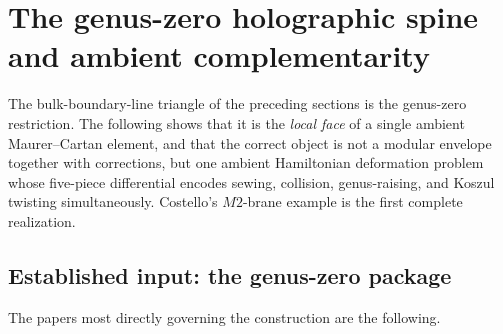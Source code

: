 


\section{The genus-zero holographic spine and ambient complementarity}

The bulk-boundary-line triangle of the preceding sections
is the genus-zero restriction. The following shows that it is the \emph{local face}
of a single ambient Maurer--Cartan element, and that the correct
object is not a modular envelope together with corrections, but one
ambient Hamiltonian deformation problem whose five-piece differential
encodes sewing, collision, genus-raising, and Koszul twisting
simultaneously. Costello's $M2$-brane example is the first
complete realization.

\subsection{Established input: the genus-zero package}

The papers most directly governing the construction are the
following.

